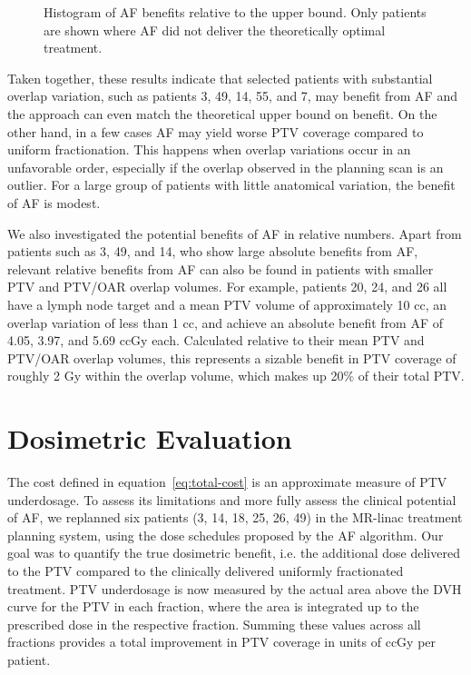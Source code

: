 \documentclass[11pt]{article}
\begin{document}
\begin{figure}[ht]
\centering
{}
\caption{Histogram of AF benefits relative to the upper bound. Only patients are shown where AF did not deliver the theoretically optimal treatment.}
\label{fig:upper-bound-gap}
\end{figure}

Taken together, these results indicate that selected patients with substantial overlap variation, such as patients 3, 49, 14, 55, and 7, may benefit from AF and the approach can even match the theoretical upper bound on benefit. On the other hand, in a few cases AF may yield worse PTV coverage compared to uniform fractionation. This happens when overlap variations occur in an unfavorable order, especially if the overlap observed in the planning scan is an outlier. For a large group of patients with little anatomical variation, the benefit of AF is modest.

We also investigated the potential benefits of AF in relative numbers. Apart from patients such as 3, 49, and 14, who show large absolute benefits from AF, relevant relative benefits from AF can also be found in patients with smaller PTV and PTV/OAR overlap volumes. For example, patients 20, 24, and 26 all have a lymph node target and a mean PTV volume of approximately 10 cc, an overlap variation of less than 1 cc, and achieve an absolute benefit from AF of 4.05, 3.97, and 5.69 ccGy each. Calculated relative to their mean PTV and PTV/OAR overlap volumes, this represents a sizable benefit in PTV coverage of roughly 2 Gy within the overlap volume, which makes up 20\% of their total PTV.

\section{Dosimetric Evaluation}

The cost defined in equation~\eqref{eq:total-cost} is an approximate measure of PTV underdosage. To assess its limitations and more fully assess the clinical potential of AF, we replanned six patients (3, 14, 18, 25, 26, 49) in the MR-linac treatment planning system, using the dose schedules proposed by the AF algorithm. Our goal was to quantify the true dosimetric benefit, i.e. the additional dose delivered to the PTV compared to the clinically delivered uniformly fractionated treatment. PTV underdosage is now measured by the actual area above the DVH curve for the PTV in each fraction, where the area is integrated up to the prescribed dose in the respective fraction. Summing these values across all fractions provides a total improvement in PTV coverage in units of ccGy per patient.
\end{document}

